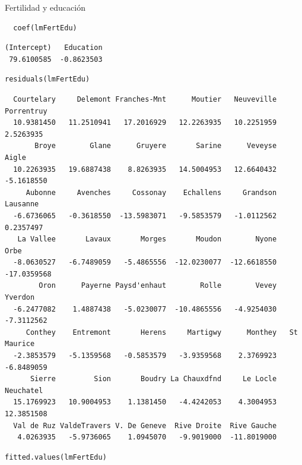 \documentclass[xcolor={usenames,svgnames,dvipsnames}]{beamer}
\begin{document}
\begin{frame}[fragile,label=sec-3-2]{Fertilidad y educación}
 \lstset{language=R,label= ,caption= ,numbers=none}
\begin{lstlisting}
  coef(lmFertEdu)
\end{lstlisting}

\begin{verbatim}
(Intercept)   Education 
 79.6100585  -0.8623503
\end{verbatim}

\lstset{language=R,label= ,caption= ,numbers=none}
\begin{lstlisting}
residuals(lmFertEdu)
\end{lstlisting}

\begin{verbatim}
  Courtelary     Delemont Franches-Mnt      Moutier   Neuveville   Porrentruy 
  10.9381450   11.2510941   17.2016929   12.2263935   10.2251959    2.5263935 
       Broye        Glane      Gruyere       Sarine      Veveyse        Aigle 
  10.2263935   19.6887438    8.8263935   14.5004953   12.6640432   -5.1618550 
     Aubonne     Avenches     Cossonay    Echallens     Grandson     Lausanne 
  -6.6736065   -0.3618550  -13.5983071   -9.5853579   -1.0112562    0.2357497 
   La Vallee       Lavaux       Morges       Moudon        Nyone         Orbe 
  -8.0630527   -6.7489059   -5.4865556  -12.0230077  -12.6618550  -17.0359568 
        Oron      Payerne Paysd'enhaut        Rolle        Vevey      Yverdon 
  -6.2477082    1.4887438   -5.0230077  -10.4865556   -4.9254030   -7.3112562 
     Conthey    Entremont       Herens     Martigwy      Monthey   St Maurice 
  -2.3853579   -5.1359568   -0.5853579   -3.9359568    2.3769923   -6.8489059 
      Sierre         Sion       Boudry La Chauxdfnd     Le Locle    Neuchatel 
  15.1769923   10.9004953    1.1381450   -4.4242053    4.3004953   12.3851508 
  Val de Ruz ValdeTravers V. De Geneve  Rive Droite  Rive Gauche 
   4.0263935   -5.9736065    1.0945070   -9.9019000  -11.8019000
\end{verbatim}

\lstset{language=R,label= ,caption= ,numbers=none}
\begin{lstlisting}
fitted.values(lmFertEdu)
\end{lstlisting}


\end{frame}
\end{document}

